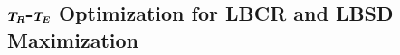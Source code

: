 \documentclass[10pt,a4paper,twoside]{article}
\begin{document}
\begin{itemize}
\end{itemize}

\subsection{\( \vb*{T_R} \)-\( \vb*{T_E} \) Optimization for LBCR and LBSD Maximization}
\end{document}
